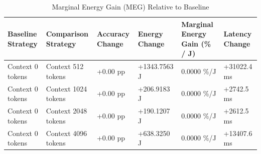 \begin{table}
\caption{Marginal Energy Gain (MEG) Relative to Baseline}
\label{tab:marginal_energy_gain}
\begin{tabular}{llllll}
\toprule
Baseline Strategy & Comparison Strategy & Accuracy Change & Energy Change & Marginal Energy Gain (\% / J) & Latency Change \\
\midrule
Context 0 tokens & Context 512 tokens & +0.00 pp & +1343.7563 J & 0.0000 \%/J & +31022.4 ms \\
Context 0 tokens & Context 1024 tokens & +0.00 pp & +206.9183 J & 0.0000 \%/J & +2742.5 ms \\
Context 0 tokens & Context 2048 tokens & +0.00 pp & +190.1207 J & 0.0000 \%/J & +2612.5 ms \\
Context 0 tokens & Context 4096 tokens & +0.00 pp & +638.3250 J & 0.0000 \%/J & +13407.6 ms \\
\bottomrule
\end{tabular}
\end{table}
